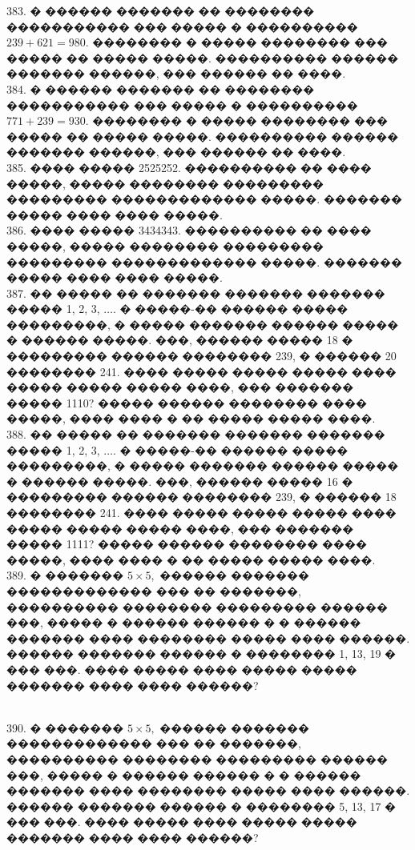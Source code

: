 \documentclass[12pt]{article}
\begin{document}
383. � ������ ������� �� �������� ����������� ��� ����� � ���������� $239+621=980.$ �������� � ����� �������� ��� ����� �� ����� �����. ���������� ������ ������� ������, ��� ������ �� ����.\\
384. � ������ ������� �� �������� ����������� ��� ����� � ���������� $771+239=930.$ �������� � ����� �������� ��� ����� �� ����� �����. ���������� ������ ������� ������, ��� ������ �� ����.\\
385. ���� ����� 2525252. ���������� �� ���� �����, ����� �������� ��������� ��������� ������������� �����. ������� ����� ���� ���� �����.\\
386. ���� ����� 3434343. ���������� �� ���� �����, ����� �������� ��������� ��������� ������������� �����. ������� ����� ���� ���� �����.\\
387. �� ����� �� ������� ������� ������� ����� 1, 2, 3, $\ldots.$ � �����-�� ������ ����� ���������, � ����� ������� ������ ����� � ������ �����. ���, ������ ����� 18 � ��������� ������ �������� 239, � ������ 20 �������� 241. ���� ����� ����� ����� ���� ����� ����� ����� ����, ��� ������� ����� 1110? ����� ������ �������� ���� �����, ���� ���� � �� ����� ����� ����.\\
388. �� ����� �� ������� ������� ������� ����� 1, 2, 3, $\ldots.$ � �����-�� ������ ����� ���������, � ����� ������� ������ ����� � ������ �����. ���, ������ ����� 16 � ��������� ������ �������� 239, � ������ 18 �������� 241. ���� ����� ����� ����� ���� ����� ����� ����� ����, ��� ������� ����� 1111? ����� ������ �������� ���� �����, ���� ���� � �� ����� ����� ����.\\
389. � ������� $5\times5,$ ������ ������� ������������� ��� �� �������, ���������� �������� ��������� ������ ���, ����� � ������ ������ � � ������ ������� ���� �������� ����� ���� ������. ������ ������� ������ � �������� 1, 13, 19 � ��� ���. ���� ����� ���� ����� ����� ������� ���� ���� ������?\\
\begin{figure}[ht!]
\end{figure}\\
390. � ������� $5\times5,$ ������ ������� ������������� ��� �� �������, ���������� �������� ��������� ������ ���, ����� � ������ ������ � � ������ ������� ���� �������� ����� ���� ������. ������ ������� ������ � �������� 5, 13, 17 � ��� ���. ���� ����� ���� ����� ����� ������� ���� ���� ������?\\
\begin{figure}[ht!]
\end{figure}\\
\end{document}
